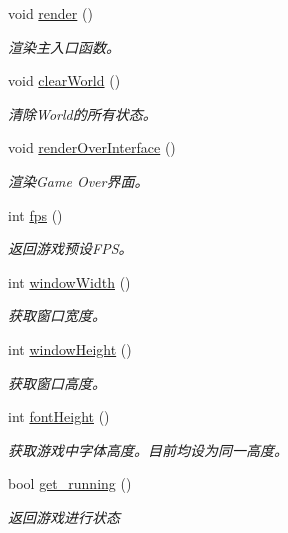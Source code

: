 \begin{DoxyCompactItemize}
void \hyperlink{class_world_a150eab10c21532162bb698d72aecec16}{render} ()
\begin{DoxyCompactList}\small\item\em 渲染主入口函数。 \end{DoxyCompactList}\item 
void \hyperlink{class_world_aa6e788d15f389d634ccd1148f47cfb96}{clear\+World} ()
\begin{DoxyCompactList}\small\item\em 清除\+World的所有状态。 \end{DoxyCompactList}\item 
void \hyperlink{class_world_ae265f543993824e9cca76eef29e375cb}{render\+Over\+Interface} ()
\begin{DoxyCompactList}\small\item\em 渲染\+Game Over界面。 \end{DoxyCompactList}\item 
int \hyperlink{class_world_a19de028e63984484f24d0c01107060d2}{fps} ()
\begin{DoxyCompactList}\small\item\em 返回游戏预设\+F\+P\+S。 \end{DoxyCompactList}\item 
int \hyperlink{class_world_abaa042832b0d02dd6d9d01a1d03308ee}{window\+Width} ()
\begin{DoxyCompactList}\small\item\em 获取窗口宽度。 \end{DoxyCompactList}\item 
int \hyperlink{class_world_a1be83eac68417720386d6f04406675e2}{window\+Height} ()
\begin{DoxyCompactList}\small\item\em 获取窗口高度。 \end{DoxyCompactList}\item 
int \hyperlink{class_world_ac2e956852ab6159780a873c961dad416}{font\+Height} ()
\begin{DoxyCompactList}\small\item\em 获取游戏中字体高度。目前均设为同一高度。 \end{DoxyCompactList}\item 
bool \hyperlink{class_world_a485fb0b11ed568979df0b6f782aa3ac8}{get\+\_\+running} ()
\begin{DoxyCompactList}\small\item\em 返回游戏进行状态 \end{DoxyCompactList}\end{DoxyCompactItemize}
